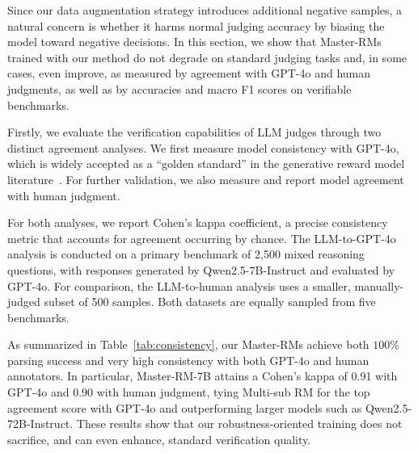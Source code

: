 Since our data augmentation strategy introduces additional negative samples, a natural concern is whether it harms normal judging accuracy by biasing the model toward negative decisions. In this section, we show that Master-RMs trained with our method do not degrade on standard judging tasks and, in some cases, even improve, as measured by agreement with GPT-4o and human judgments, as well as by accuracies and macro F1 scores on verifiable benchmarks.

Firstly, we evaluate the verification capabilities of LLM judges through two distinct agreement analyses. We first measure model consistency with GPT-4o, which is widely accepted as a ``golden standard'' in the generative reward model literature~\citep{gao2024omnimathuniversalolympiadlevel,su2025crossing}. For further validation, we also measure and report model agreement with human judgment.


For both analyses, we report Cohen's kappa coefficient, a precise consistency metric that accounts for agreement occurring by chance. The LLM-to-GPT-4o analysis is conducted on a primary benchmark of 2,500 mixed reasoning questions, with responses generated by Qwen2.5-7B-Instruct and evaluated by GPT-4o. For comparison, the LLM-to-human analysis uses a smaller, manually-judged subset of 500 samples. Both datasets are equally sampled from five benchmarks.



As summarized in Table~\ref{tab:consistency}, our Master-RMs achieve both $100\%$ parsing success and very high consistency with both GPT-4o and human annotators. In particular, Master-RM-7B attains a Cohen's kappa of 0.91 with GPT-4o and 0.90 with human judgment, tying Multi-sub RM for the top agreement score with GPT-4o and outperforming larger models such as Qwen2.5-72B-Instruct. These results show that our robustness-oriented training does not sacrifice, and can even enhance, standard verification quality.




